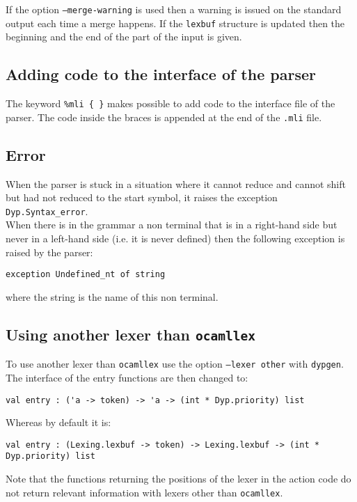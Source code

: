 \documentclass[12pt]{article}
\begin{document}
{If the option \texttt{--merge-warning} is used then a warning is issued on the standard output each time a merge happens. If the \texttt{lexbuf} structure is updated then the beginning and the end of the part of the input is given.

\subsection{Adding code to the interface of the parser} \label{mli}

The keyword \texttt{\%mli \{ \}} makes possible to add code to the interface file of the parser. The code inside the braces is appended at the end of the \texttt{.mli} file.

\subsection{Error}

When the parser is stuck in a situation where it cannot reduce and cannot shift but had not reduced to the start symbol, it raises the exception \verb|Dyp.Syntax_error|.\\

When there is in the grammar a non terminal that is in a right-hand side but never in a left-hand side (i.e. it is never defined) then the following exception is raised by the parser:
\begin{verbatim}
exception Undefined_nt of string
\end{verbatim}
where the string is the name of this non terminal.

\subsection{Using another lexer than \texttt{ocamllex}}\label{other-lexer}

To use another lexer than \texttt{ocamllex} use the option \texttt{--lexer other} with \texttt{dypgen}. The interface of the entry functions are then changed to:
\begin{verbatim}
val entry : ('a -> token) -> 'a -> (int * Dyp.priority) list
\end{verbatim}
Whereas by default it is:
\begin{verbatim}
val entry : (Lexing.lexbuf -> token) -> Lexing.lexbuf -> (int * Dyp.priority) list
\end{verbatim}

Note that the functions returning the positions of the lexer in the action code do not return relevant information with lexers other than \texttt{ocamllex}.

}
\end{document}
